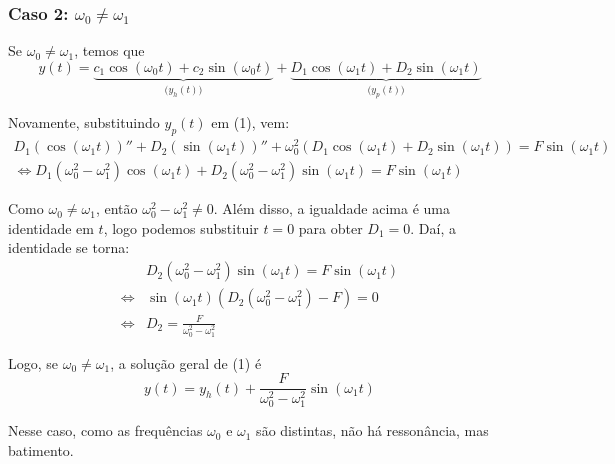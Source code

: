 \documentclass{article}
\begin{document}
\subsubsection{Caso 2: $\omega_0 \neq \omega_1$}
\par\hspace{12pt} Se $\omega_0 \neq \omega_1$, temos que
\begin{equation*}
y(t) = \underbrace{c_1\cos(\omega_0t) + c_2\sin(\omega_0t)}_{\big (y_h(t)\big)} + \underbrace{D_1\cos(\omega_1t) + D_2\sin(\omega_1t)}_{\big (y_p(t)\big)}
\end{equation*}
\par Novamente, substituindo $y_p(t)$ em (1), vem:
\begin{align*}
D_1(\cos(\omega_1t))'' + D_2(\sin(\omega_1t))'' + \omega_0 ^2(D_1\cos(\omega_1t) + D_2\sin(\omega_1t)) = F\sin(\omega_1t) \\ \Leftrightarrow D_1(\omega_0 ^2 - \omega_1 ^2)\cos(\omega_1t) + D_2(\omega_0 ^2 - \omega_1 ^2)\sin(\omega_1t) = F\sin(\omega_1t)
\end{align*}
\par Como $\omega_0 \neq \omega_1$, então $\omega_0 ^2 - \omega_1 ^2 \neq 0$. Além disso, a igualdade acima é uma identidade em $t$, logo podemos substituir $t = 0$ para obter $D_1 = 0$. Daí, a identidade se torna:
\begin{align*}
&D_2(\omega_0 ^2 - \omega_1 ^2)\sin(\omega_1t) = F\sin(\omega_1t) \\ \Leftrightarrow &\sin(\omega_1t)(D_2(\omega_0 ^2 - \omega_1 ^2) - F) = 0 \\ \Leftrightarrow &D_2 = \frac{F}{\omega_0 ^2 - \omega_1 ^2}
\end{align*}
\par Logo, se $\omega_0 \neq \omega_1$, a solução geral de (1) é
\begin{equation*}
y(t) = y_h(t) + \frac{F}{\omega_0 ^2 - \omega_1 ^2}\sin(\omega_1t)
\end{equation*}
\par Nesse caso, como as frequências $\omega_0$ e $\omega_1$ são distintas, não há ressonância, mas batimento.
\end{document}
